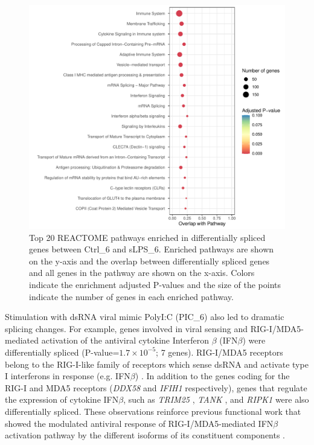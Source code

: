 \begin{figure}[H]
  \centering
  \includegraphics[width=\textwidth]{ds_sLPS_6_vs_Ctrl_6}
  \caption{Top 20 REACTOME pathways enriched in differentially spliced genes between Ctrl\_6 and sLPS\_6. Enriched pathways are shown on the y-axis and the overlap between differentially spliced genes and all genes in the pathway are shown on the x-axis. Colors indicate the enrichment adjusted P-values and the size of the points indicate the number of genes in each enriched pathway.}
  \label{fig:ds_sLPS_6_vs_Ctrl_6}   
\end{figure}

Stimulation with dsRNA viral mimic PolyI:C (PIC\_6) also led to dramatic splicing changes. For example, genes involved in viral sensing and RIG-I/MDA5-mediated activation of the antiviral cytokine Interferon $\beta$ (IFN$\beta$) were differentially spliced (P-value=$1.7\times10^{-5}$; 7 genes). RIG-I/MDA5 receptors belong to the RIG-I-like family of receptors which sense dsRNA and activate type I interferons in response (e.g. IFN$\beta$) \cite{Yoneyama2005-ba,Kato2005-ie}. In addition to the genes coding for the RIG-I and MDA5 receptors (\textit{DDX58} and \textit{IFIH1} respectively), genes that regulate the expression of cytokine IFN$\beta$, such as \textit{TRIM25} \cite{Castanier2012-io}, \textit{TANK} \cite{Al_Hamrashdi2022-pr}, and \textit{RIPK1} \cite{Saleh2017-fv} were also differentially spliced. These observations reinforce previous functional work that showed the modulated antiviral response of RIG-I/MDA5-mediated IFN$\beta$ activation pathway by the different isoforms of its constituent components \cite{Gack2009-nw,Liao2021-aj,Lad2008-jd}. \\



